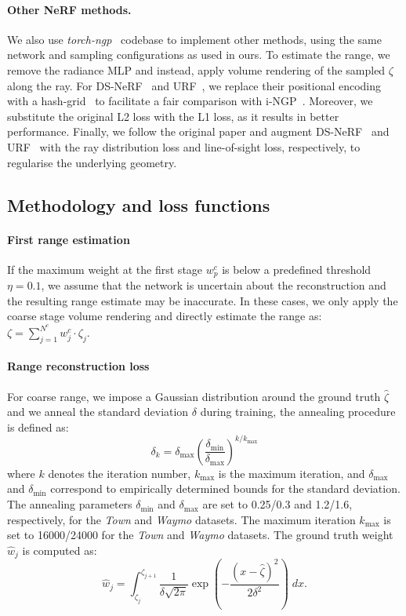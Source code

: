 \paragraph{Other NeRF methods.}
We also use \emph{torch-ngp}~\cite{torch-ngp} codebase to implement other methods, using the same network and sampling configurations as used in ours. To estimate the range, we remove the radiance MLP and instead, apply volume rendering of the sampled $\zeta$ along the ray.  For DS-NeRF~\cite{deng2021depth} and URF~\cite{rematas2021urban}, we replace their positional encoding with a hash-grid~\cite{muller2022instant} to facilitate a fair comparison with i-NGP~\cite{muller2022instant}. Moreover, we substitute the original L2 loss with the L1 loss, as it results in better performance. Finally, we follow the original paper and augment DS-NeRF~\cite{deng2021depth} and URF~\cite{rematas2021urban} with the ray distribution loss and line-of-sight loss, respectively, to regularise the underlying geometry. 


\subsection{Methodology and loss functions}
\label{sec:supp_method}
\paragraph{First range estimation}
If the maximum weight at the first stage $w_p^c$ is below a predefined threshold $\eta=0.1$, we assume that the network is uncertain about the reconstruction and the resulting range estimate may be inaccurate. In these cases, we only apply the coarse stage volume rendering and directly estimate the range as: $\zeta = \sum_{j=1}^{N^c} w_j^c \cdot \zeta_j$. 

\paragraph{Range reconstruction loss}
For coarse range, we impose a Gaussian distribution around the ground truth $\hat{\zeta}$ and we anneal the standard deviation $\delta$ during training, the annealing procedure is defined as:
\begin{equation}
    \delta_k = \delta_{\max} \left(\frac{\delta_{\min}}{\delta_{\max}}\right)^{k / k_{\max}}
\end{equation}
where $k$ denotes the iteration number, $k_{\max}$ is the maximum iteration, and $\delta_{\max}$ and $\delta_{\min}$ correspond to empirically determined bounds for the standard deviation. The annealing parameters $\delta_{\min}$ and $\delta_{\max}$ are set to 0.25/0.3 and 1.2/1.6, respectively, for the \textit{Town} and \textit{Waymo} datasets. The maximum iteration $k_{\max}$ is set to 16000/24000 for the \textit{Town} and \textit{Waymo} datasets. 
The ground truth weight $\hat{w}_j$ is computed as:
\begin{equation}
    \hat{w}_j = \int_{\zeta_j}^{\zeta_{j+1}} \frac{1}{\delta\sqrt{2\pi}}\exp\left(-\frac{(x - \hat{\zeta})^2}{2\delta^2}\right) \; dx.
\end{equation}


